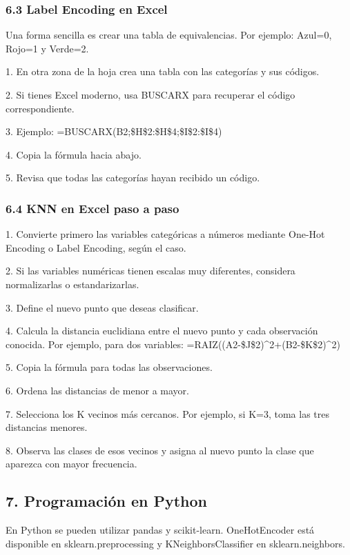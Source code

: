 \documentclass[]{article}
\begin{document}
\subsubsection{6.3 Label Encoding en
Excel}\label{label-encoding-en-excel}

Una forma sencilla es crear una tabla de equivalencias. Por ejemplo:
Azul=0, Rojo=1 y Verde=2.

1. En otra zona de la hoja crea una tabla con las categorías y sus
códigos.

2. Si tienes Excel moderno, usa BUSCARX para recuperar el código
correspondiente.

3. Ejemplo: =BUSCARX(B2;\$H\$2:\$H\$4;\$I\$2:\$I\$4)

4. Copia la fórmula hacia abajo.

5. Revisa que todas las categorías hayan recibido un código.

\subsubsection{6.4 KNN en Excel paso a
paso}\label{knn-en-excel-paso-a-paso}

1. Convierte primero las variables categóricas a números mediante
One-Hot Encoding o Label Encoding, según el caso.

2. Si las variables numéricas tienen escalas muy diferentes, considera
normalizarlas o estandarizarlas.

3. Define el nuevo punto que deseas clasificar.

4. Calcula la distancia euclidiana entre el nuevo punto y cada
observación conocida. Por ejemplo, para dos variables:
=RAIZ((A2-\$J\$2)\^{}2+(B2-\$K\$2)\^{}2)

5. Copia la fórmula para todas las observaciones.

6. Ordena las distancias de menor a mayor.

7. Selecciona los K vecinos más cercanos. Por ejemplo, si K=3, toma las
tres distancias menores.

8. Observa las clases de esos vecinos y asigna al nuevo punto la clase
que aparezca con mayor frecuencia.

\subsection{7. Programación en Python}\label{programaciuxf3n-en-python}

En Python se pueden utilizar pandas y scikit-learn. OneHotEncoder está
disponible en sklearn.preprocessing y KNeighborsClassifier en
sklearn.neighbors.
\end{document}
